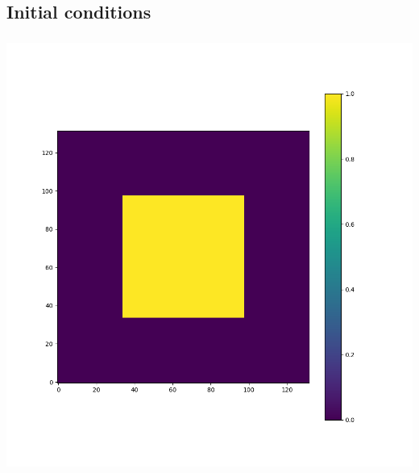 \documentclass[aspectratio=43, t]{beamer}
\begin{document}
\subsection*{Initial conditions}
\begin{frame}
	\frametitle{\subsecname}
	\centering
	\includegraphics[width = \textwidth, height = \textheight, keepaspectratio]{in_field}
	\par
\end{frame}
\end{document}

